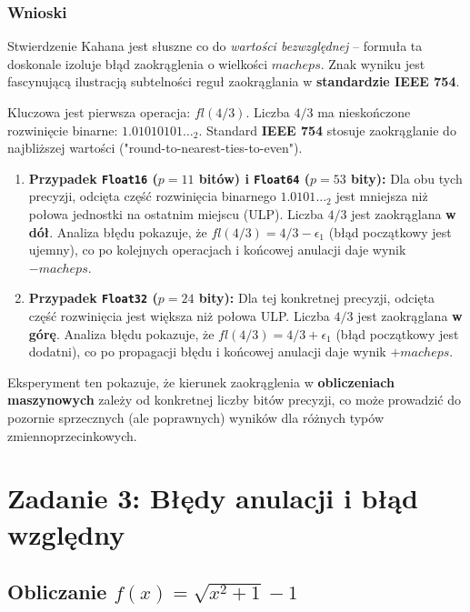 \documentclass[12pt,a4paper]{article}
\begin{document}
\subsubsection{Wnioski}
Stwierdzenie Kahana jest słuszne co do \textit{wartości bezwzględnej} – formuła ta doskonale izoluje błąd zaokrąglenia o wielkości $macheps$. Znak wyniku jest fascynującą ilustracją subtelności reguł zaokrąglania w \textbf{standardzie IEEE 754}.

Kluczowa jest pierwsza operacja: $\textit{fl}(4/3)$. Liczba $4/3$ ma nieskończone rozwinięcie binarne: $1.01010101\ldots_2$. Standard \textbf{IEEE 754} stosuje zaokrąglanie do najbliższej wartości ("round-to-nearest-ties-to-even").

\begin{enumerate}
    \item \textbf{Przypadek \texttt{Float16} ($p=11$ bitów) i \texttt{Float64} ($p=53$ bity):}
    Dla obu tych precyzji, odcięta część rozwinięcia binarnego $1.0101\ldots_2$ jest mniejsza niż połowa jednostki na ostatnim miejscu (ULP). Liczba $4/3$ jest zaokrąglana \textbf{w dół}. 
    Analiza błędu pokazuje, że $\textit{fl}(4/3) = 4/3 - \epsilon_1$ (błąd początkowy jest ujemny), co po kolejnych operacjach i końcowej anulacji daje wynik $-macheps$.

    \item \textbf{Przypadek \texttt{Float32} ($p=24$ bity):}
    Dla tej konkretnej precyzji, odcięta część rozwinięcia jest większa niż połowa ULP. Liczba $4/3$ jest zaokrąglana \textbf{w górę}.
    Analiza błędu pokazuje, że $\textit{fl}(4/3) = 4/3 + \epsilon_1$ (błąd początkowy jest dodatni), co po propagacji błędu i końcowej anulacji daje wynik $+macheps$.
\end{enumerate}

Eksperyment ten pokazuje, że kierunek zaokrąglenia w \textbf{obliczeniach maszynowych} zależy od konkretnej liczby bitów precyzji, co może prowadzić do pozornie sprzecznych (ale poprawnych) wyników dla różnych typów zmiennoprzecinkowych.

\section{Zadanie 3: Błędy anulacji i błąd względny}

\subsection{Obliczanie $f(x) = \sqrt{x^2 + 1} - 1$}
\end{document}
